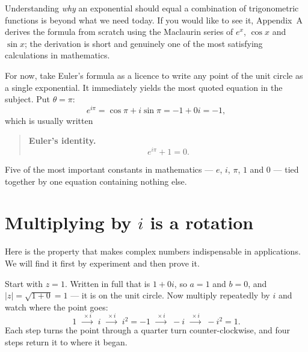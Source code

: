 \documentclass[11pt]{article}
\theoremstyle{definition}
\theoremstyle{remark}
\newcommand{\Rez}{\operatorname{Re}}
\newcommand{\Imz}{\operatorname{Im}}
\newcommand{\cpoint}[5]{%
  \fill[#3] (#1,#2) circle (2.1pt);
  \node[#5,font=\scriptsize,#3] at (#1,#2) {#4};
}
\begin{document}
\noindent Understanding \emph{why} an exponential should equal a combination of
trigonometric functions is beyond what we need today. If you would like to see
it, Appendix~A derives the formula from scratch using the Maclaurin series of
$e^{x}$, $\cos x$ and $\sin x$; the derivation is short and genuinely one of the
most satisfying calculations in mathematics.

For now, take Euler's formula as a licence to write any point of the unit circle
as a single exponential. It immediately yields the most quoted equation in the
subject. Put $\theta=\pi$:
\[
  e^{i\pi} = \cos\pi + i\sin\pi = -1 + 0i = -1 ,
\]
which is usually written

\begin{quote}
\textbf{Euler's identity.}
\[
  e^{i\pi} + 1 = 0 .
\]
\end{quote}

\noindent Five of the most important constants in mathematics --- $e$, $i$,
$\pi$, $1$ and $0$ --- tied together by one equation containing nothing else.

\section{Multiplying by $i$ is a rotation}
Here is the property that makes complex numbers indispensable in applications.
We will find it first by experiment and then prove it.

Start with $z=1$. Written in full that is $1+0i$, so $a=1$ and $b=0$, and
$\lvert z\rvert=\sqrt{1+0}=1$ --- it is on the unit circle. Now multiply
repeatedly by $i$ and watch where the point goes:
\[
  1
  \;\xrightarrow{\;\times i\;}\;
  i
  \;\xrightarrow{\;\times i\;}\;
  i^{2}=-1
  \;\xrightarrow{\;\times i\;}\;
  -i
  \;\xrightarrow{\;\times i\;}\;
  -i^{2}=1 .
\]
Each step turns the point through a quarter turn counter-clockwise, and four
steps return it to where it began.

\begin{center}
\end{center}
\end{document}

